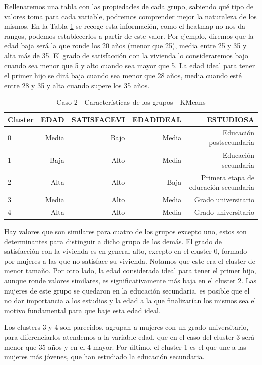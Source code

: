 \documentclass[a4paper, 20pt]{article}
\begin{document}
Rellenaremos una tabla con las propiedades de cada grupo, sabiendo qué tipo de valores toma para cada variable, podremos comprender mejor la naturaleza de los mismos. En la Tabla \ref{tab:KMeans_carac2} se recoge esta información, como el heatmap no nos da rangos, podemos establecerlos a partir de este valor. Por ejemplo, diremos que la edad baja será la que ronde los 20 años (menor que 25), media entre 25 y 35 y alta más de 35. El grado de satisfacción con la vivienda lo consideraremos bajo cuando sea menor que 5 y alto cuando sea mayor que 5. La edad ideal para tener el primer hijo se dirá baja cuando sea menor que 28 años, media cuando esté entre 28 y 35 y alta cuando supere los 35 años. 

\begin{table}[H]
\centering
\caption{Caso 2 - Características de los grupos - KMeans}
\label{tab:KMeans_carac2}
\begin{tabular}{lrrrr}
\toprule
Cluster & EDAD & SATISFACEVI & EDADIDEAL & ESTUDIOSA\\
\midrule
0 & Media & Bajo & Media & Educación postsecundaria \\
1 & Baja & Alto & Media & Educación secundaria \\
2 & Alta & Alto & Baja & Primera etapa de educación secundaria \\
3 & Media & Alto & Media & Grado universitario \\
4 & Alta & Alto & Media & Grado universitario \\
\bottomrule
\end{tabular}
\end{table}

Hay valores que son similares para cuatro de los grupos excepto uno, estos son determinantes para distinguir a dicho grupo de los demás. El grado de satisfacción con la vivienda es en general alto, excepto en el cluster 0, formado por mujeres a las que no satisface su vivienda. Notamos que este era el cluster de menor tamaño. Por otro lado, la edad considerada ideal para tener el primer hijo, aunque ronde valores similares, es significativamente más baja en el cluster 2. Las mujeres de este grupo se quedaron en la educación secundaria, es posible que el no dar importancia a los estudios y la edad a la que finalizarían los mismos sea el motivo fundamental para que baje esta edad ideal.

Los clusters 3 y 4 son parecidos, agrupan a mujeres con un grado universitario, para diferenciarlos atendemos a la variable edad, que en el caso del cluster 3 será menor que 35 años y en el 4 mayor. Por último, el cluster 1 es el que une a las mujeres más jóvenes, que han estudiado la educación secundaria.
\end{document}
